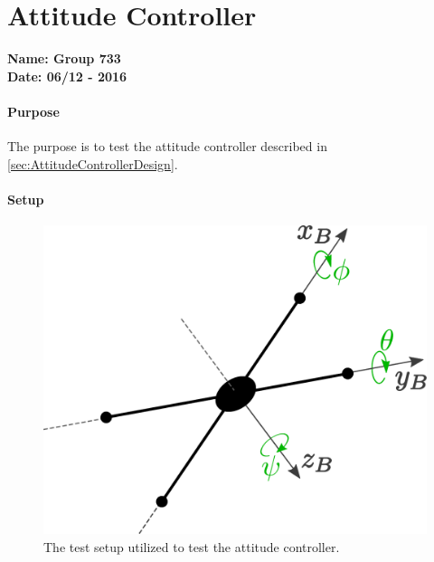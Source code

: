 \chapter{Attitude Controller}\label{app:AttitudeControllerTest} 
\textbf{Name: Group 733}\\
\textbf{Date: 06/12 - 2016}

\subsubsection{Purpose}
The purpose is to test the attitude controller described in \autoref{sec:AttitudeControllerDesign}.


\subsubsection{Setup}
\begin{figure}[H]
	\centering
	\includegraphics[scale=0.4]{figures/plusConfiguration}
	\caption{The test setup utilized to test the attitude controller.}
	\label{fig:AttitudeControllerTestsetup}
\end{figure}


